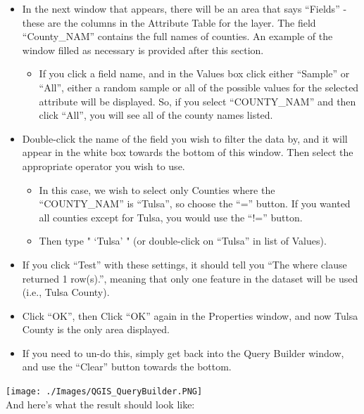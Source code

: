 \documentclass[12pt,]{article}
\begin{document}
\begin{itemize}
\itemsep1pt\parskip0pt
\item
  In the next window that appears, there will be an area that says
  ``Fields'' - these are the columns in the Attribute Table for the
  layer. The field ``County\_NAM'' contains the full names of counties.
  An example of the window filled as necessary is provided after this
  section.

  \begin{itemize}
  \itemsep1pt\parskip0pt
  \item
    If you click a field name, and in the Values box click either
    ``Sample'' or ``All'', either a random sample or all of the possible
    values for the selected attribute will be displayed. So, if you
    select ``COUNTY\_NAM'' and then click ``All'', you will see all of
    the county names listed.
  \end{itemize}
\item
  Double-click the name of the field you wish to filter the data by, and
  it will appear in the white box towards the bottom of this window.
  Then select the appropriate operator you wish to use.

  \begin{itemize}
  \itemsep1pt\parskip0pt
  \item
    In this case, we wish to select only Counties where the
    ``COUNTY\_NAM'' is ``Tulsa'', so choose the ``='' button. If you
    wanted all counties except for Tulsa, you would use the ``!=''
    button.
  \item
    Then type " `Tulsa' " (or double-click on ``Tulsa'' in list of
    Values).
  \end{itemize}
\item
  If you click ``Test'' with these settings, it should tell you ``The
  where clause returned 1 row(s).'', meaning that only one feature in
  the dataset will be used (i.e., Tulsa County).
\item
  Click ``OK'', then Click ``OK'' again in the Properties window, and
  now Tulsa County is the only area displayed.
\item
  If you need to un-do this, simply get back into the Query Builder
  window, and use the ``Clear'' button towards the bottom.
\end{itemize}

\texttt{[image: ./Images/QGIS\_QueryBuilder.PNG]}\\

And here's what the result should look like:
\end{document}

